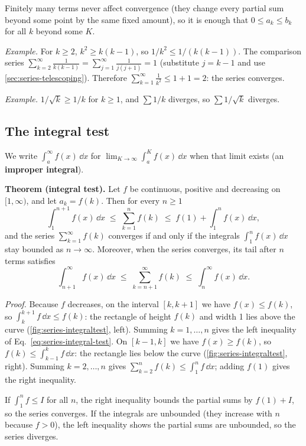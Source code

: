 Finitely many terms never affect convergence (they change every partial sum beyond some point by the same fixed amount), so it is enough that $0\le a_k\le b_k$ for all $k$ beyond some $K$.

\emph{Example.} For $k\ge2$, $k^2\ge k(k-1)$, so $1/k^2\le1/(k(k-1))$. The comparison series $\sum_{k=2}^\infty\frac1{k(k-1)}=\sum_{j=1}^\infty\frac1{j(j+1)}=1$ (substitute $j=k-1$ and use \cref{sec:series-telescoping}). Therefore $\sum_{k=1}^\infty\frac1{k^2}\le1+1=2$: the series converges.

\emph{Example.} $1/\sqrt k\ge1/k$ for $k\ge1$, and $\sum1/k$ diverges, so $\sum1/\sqrt k$ diverges.

\subsection{The integral test}

We write $\int_a^\infty f(x)\,\dd x$ for $\lim_{K\to\infty}\int_a^K f(x)\,\dd x$ when that limit exists (an \textbf{improper integral}).

\textbf{Theorem (integral test).} Let $f$ be continuous, positive and decreasing on $[1,\infty)$, and let $a_k=f(k)$. Then for every $n\ge1$
\begin{equation}
\int_1^{n+1}f(x)\,\dd x\;\le\;\sum_{k=1}^{n}f(k)\;\le\;f(1)+\int_1^{n}f(x)\,\dd x,
\label{eq:series-integral-test}
\end{equation}
and the series $\sum_{k=1}^\infty f(k)$ converges if and only if the integrals $\int_1^nf(x)\,\dd x$ stay bounded as $n\to\infty$. Moreover, when the series converges, its tail after $n$ terms satisfies
\begin{equation}
\int_{n+1}^{\infty}f(x)\,\dd x\;\le\;\sum_{k=n+1}^{\infty}f(k)\;\le\;\int_{n}^{\infty}f(x)\,\dd x .
\label{eq:series-tail-bounds}
\end{equation}

\emph{Proof.} Because $f$ decreases, on the interval $[k,k+1]$ we have $f(x)\le f(k)$, so $\int_k^{k+1}f\,\dd x\le f(k)$: the rectangle of height $f(k)$ and width 1 lies above the curve (\cref{fig:series-integraltest}, left). Summing $k=1,\dots,n$ gives the left inequality of Eq.~\eqref{eq:series-integral-test}. On $[k-1,k]$ we have $f(x)\ge f(k)$, so $f(k)\le\int_{k-1}^kf\,\dd x$: the rectangle lies below the curve (\cref{fig:series-integraltest}, right). Summing $k=2,\dots,n$ gives $\sum_{k=2}^nf(k)\le\int_1^nf\,\dd x$; adding $f(1)$ gives the right inequality.

If $\int_1^nf\le I$ for all $n$, the right inequality bounds the partial sums by $f(1)+I$, so the series converges. If the integrals are unbounded (they increase with $n$ because $f>0$), the left inequality shows the partial sums are unbounded, so the series diverges.

